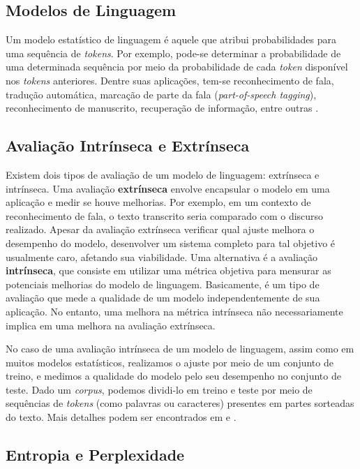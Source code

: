 \documentclass{automatextcc}
\begin{document}
\subsection{Modelos de Linguagem}
Um modelo estatístico de linguagem é aquele que atribui probabilidades para uma sequência de \textit{tokens}. Por exemplo, pode-se determinar a probabilidade de uma determinada sequência por meio da probabilidade de cada \textit{token} disponível nos \textit{tokens} anteriores. Dentre suas aplicações, tem-se reconhecimento de fala, tradução automática, marcação de parte da fala (\textit{part-of-speech tagging}), reconhecimento de manuscrito, recuperação de informação, entre outras
\citep{kamath2019, jurafsky2021}.




\subsection{Avaliação Intrínseca e Extrínseca}
Existem dois tipos de avaliação de um modelo de linguagem: extrínseca e intrínseca. Uma avaliação \textbf{extrínseca} envolve encapsular o modelo em uma aplicação e medir se houve melhorias. Por exemplo, em um contexto de reconhecimento de fala, o texto transcrito seria comparado com o discurso realizado. Apesar da avaliação extrínseca verificar qual ajuste melhora o desempenho do modelo, desenvolver um sistema completo para tal objetivo é usualmente caro, afetando sua viabilidade. Uma alternativa é a avaliação \textbf{intrínseca}, que consiste em utilizar uma métrica objetiva para mensurar as potenciais melhorias do modelo de linguagem. Basicamente, é um tipo de avaliação que mede a qualidade de um modelo independentemente de sua aplicação. No entanto, uma melhora na métrica intrínseca não necessariamente implica em uma melhora na avaliação extrínseca. 

No caso de uma avaliação intrínseca de um modelo de linguagem, assim como em muitos modelos estatísticos, realizamos o ajuste por meio de um conjunto de treino, e medimos a qualidade do modelo pelo seu desempenho no conjunto de teste. Dado um \textit{corpus}, podemos dividi-lo em treino e teste por meio de sequências de \textit{tokens} (como palavras ou caracteres) presentes em partes sorteadas do texto. Mais detalhes podem ser encontrados em \citet{goldberg2017} e \citet{jurafsky2021}.




\subsection{Entropia e Perplexidade}
\label{entropia e perplexidade}
\end{document}
